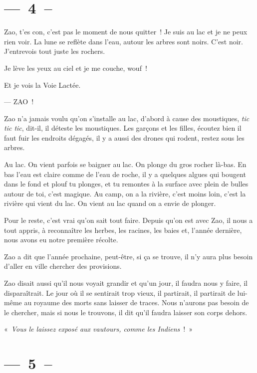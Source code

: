 \documentclass[french,twoside]{book} %
\begin{document}
\section[{— 4 –}]{— 4 –}
\renewcommand{\leftmark}{— 4 –}

\noindent Zao, t’es con, c’est pas le moment de nous quitter ! Je suis au lac et je ne peux rien voir. La lune se reflète dans l’eau, autour les arbres sont noirs. C’est noir. J’entrevois tout juste les rochers.\par
Je lève les yeux au ciel et je me couche, wouf !\par
Et je vois la Voie Lactée.\par
— ZAO !\par
\bigbreak
\noindent Zao n’a jamais voulu qu’on s’installe au lac, d’abord à cause des moustiques, \emph{tic tic tic}, dit-il, il déteste les moustiques. Les garçons et les filles, écoutez bien il faut fuir les endroits dégagés, il y a aussi des drones qui rodent, restez sous les arbres.\par
Au lac. On vient parfois se baigner au lac. On plonge du gros rocher là-bas. En bas l’eau est claire comme de l’eau de roche, il y a quelques algues qui bougent dans le fond et plouf tu plonges, et tu remontes à la surface avec plein de bulles autour de toi, c’est magique. Au camp, on a la rivière, c’est moins loin, c’est la rivière qui vient du lac. On vient au lac quand on a envie de plonger.\par
Pour le reste, c’est vrai qu’on sait tout faire. Depuis qu’on est avec Zao, il nous a tout appris, à reconnaître les herbes, les racines, les baies et, l’année dernière, nous avons eu notre première récolte.\par
Zao a dit que l’année prochaine, peut-être, si ça se trouve, il n’y aura plus besoin d’aller en ville chercher des provisions.\par
Zao disait aussi qu’il nous voyait grandir et qu’un jour, il faudra nous y faire, il disparaîtrait. Le jour où il se sentirait trop vieux, il partirait, il partirait de lui-même au royaume des morts sans laisser de traces. Nous n’aurons pas besoin de le chercher, mais si nous le trouvons, il dit qu’il faudra laisser son corps dehors.\par
« \emph{Vous le laissez exposé aux vautours, comme les Indiens} ! »

\section[{— 5 –}]{— 5 –}
\renewcommand{\leftmark}{— 5 –}
\end{document}
